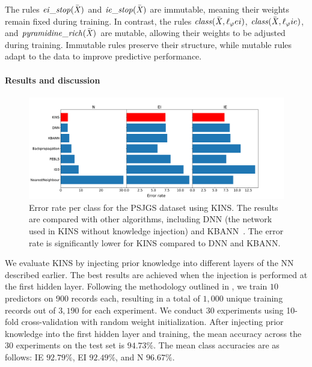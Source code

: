 The rules $\mathit{ei\_stop}(\bar{\mathit{X}})$ and $\mathit{ie\_stop}(\bar{\mathit{X}})$ are immutable, meaning their weights remain fixed during training.
%
In contrast, the rules $\mathit{class}(\bar{\mathit{X}}, \ell_{\varphi}{ei})$, $\mathit{class}(\bar{\mathit{X}}, \ell_{\varphi}{ie})$, and $\mathit{pyramidine\_rich}(\bar{\mathit{X}})$ are mutable, allowing their weights to be adjusted during training.
%
Immutable rules preserve their structure, while mutable rules adapt to the data to improve predictive performance.



\paragraph{Results and discussion}\label{par:kins-psjgs-results}
%
\begin{figure}
    \centering
    \includegraphics[width=\linewidth]{figures/psjgs-kins-error-rate}
    \caption[KINS PSJGS error rate]{
        Error rate per class for the \gls{PSJGS} dataset using \gls{KINS}.
        The results are compared with other algorithms, including DNN (the network used in KINS without knowledge injection) and KBANN~\cite{DBLP:journals/ai/TowellS94}.
        The error rate is significantly lower for \gls{KINS} compared to DNN and KBANN.
    }
    \label{fig:kins-psjgs-error-rate}
\end{figure}
%
We evaluate \gls{KINS} by injecting prior knowledge into different layers of the \gls{NN} described earlier.
%
The best results are achieved when the injection is performed at the first hidden layer.
%
Following the methodology outlined in , we train $10$ predictors on $900$ records each, resulting in a total of $1,000$ unique training records out of $3,190$ for each experiment.
%
We conduct $30$ experiments using 10-fold cross-validation with random weight initialization.
%
After injecting prior knowledge into the first hidden layer and training, the mean accuracy across the $30$ experiments on the test set is \(94.73\%\).
%
The mean class accuracies are as follows: \gls{IE} \(92.79\%\), \gls{EI} \(92.49\%\), and N \(96.67\%\).

